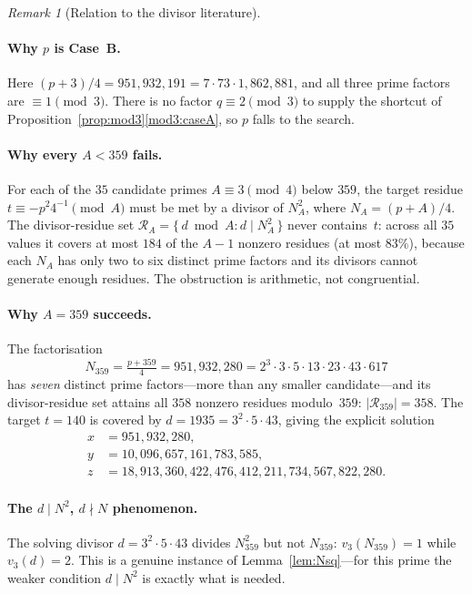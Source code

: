 \documentclass[12pt]{amsart}
\theoremstyle{definition}
\theoremstyle{remark}
\newtheorem{remark}[theorem]{Remark}
\begin{document}
\begin{remark}[Relation to the divisor literature]
\paragraph{Why $p$ is Case~B.}
Here $(p+3)/4 = 951{,}932{,}191 = 7 \cdot 73 \cdot 1{,}862{,}881$, and all
three prime factors are $\equiv 1 \pmod 3$. There is no factor
$q \equiv 2 \pmod 3$ to supply the shortcut of
Proposition~\ref{prop:mod3}\ref{mod3:caseA}, so $p$ falls to the search.

\paragraph{Why every $A < 359$ fails.}
For each of the $35$ candidate primes $A \equiv 3 \pmod 4$ below $359$, the
target residue $t \equiv -p^2 4^{-1} \pmod A$ must be met by a divisor of
$N_A^2$, where $N_A = (p+A)/4$. The divisor-residue set
$\mathcal{R}_A = \{\,d \bmod A : d \mid N_A^2\,\}$ never contains~$t$: across
all $35$ values it covers at most $184$ of the $A-1$ nonzero residues (at most
$83\%$), because each $N_A$ has only two to six distinct prime factors and its
divisors cannot generate enough residues. The obstruction is arithmetic, not
congruential.

\paragraph{Why $A = 359$ succeeds.}
The factorisation
\[
  N_{359} = \tfrac{p+359}{4} = 951{,}932{,}280
          = 2^3 \cdot 3 \cdot 5 \cdot 13 \cdot 23 \cdot 43 \cdot 617
\]
has \emph{seven} distinct prime factors---more than any smaller candidate---and
its divisor-residue set attains all $358$ nonzero residues modulo~$359$:
$|\mathcal{R}_{359}| = 358$. The target $t = 140$ is covered by
$d = 1935 = 3^2 \cdot 5 \cdot 43$, giving the explicit solution
\begin{align*}
  x &= 951{,}932{,}280, \\
  y &= 10{,}096{,}657{,}161{,}783{,}585, \\
  z &= 18{,}913{,}360{,}422{,}476{,}412{,}211{,}734{,}567{,}822{,}280 .
\end{align*}

\paragraph{The $d \mid N^2$, $d \nmid N$ phenomenon.}
The solving divisor $d = 3^2 \cdot 5 \cdot 43$ divides $N_{359}^2$ but not
$N_{359}$: $v_3(N_{359}) = 1$ while $v_3(d) = 2$. This is a genuine instance of
Lemma~\ref{lem:Nsq}---for this prime the weaker condition $d \mid N^2$ is
exactly what is needed.


\end{remark}
\end{document}
